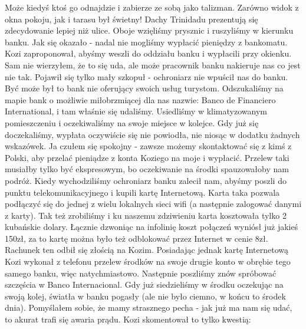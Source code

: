 Może kiedyś ktoś go odnajdzie i zabierze ze sobą jako talizman.
Zarówno widok z okna pokoju, jak i tarasu był świetny!
Dachy Trinidadu prezentują się zdecydowanie lepiej niż ulice.
Oboje wzięliśmy prysznic i ruszyliśmy w kierunku banku.
Jak się okazało - nadal nie mogliśmy wypłacić pieniędzy z bankomatu.
Kozi zaproponował, abyśmy weszli do oddziału banku i wypłacili przy okienku.
Sam nie wierzyłem, że to się uda, ale może pracownik banku nakieruje nas co jest nie tak.
Pojawił się tylko mały szkopuł - ochroniarz nie wpuścił nas do banku.
Być może był to bank nie oferujący swoich usług turystom.
Odszukaliśmy na mapie bank o możliwie miłobrzmiącej dla nas nazwie: Banco de Financiero International, i tam właśnie się udaliśmy.
Usiedliśmy w klimatyzowanym pomieszczeniu i oczekiwaliśmy na swoje miejsce w kolejce.
Gdy już się doczekaliśmy, wypłata oczywiście się nie powiodła, nie niosąc w dodatku żadnych wskazówek.
Ja czułem się spokojny - zawsze możemy skontaktować się z kimś z Polski, aby przelać pieniądze z konta Koziego na moje i wypłacić.
Przelew taki musiałby tylko być ekspresowym, bo oczekiwanie na środki spauzowałoby nam podróż.
Kiedy wychodziliśmy ochroniarz banku zalecił nam, abyśmy poszli do punktu telekomunikacyjnego i kupili kartę Internetową.
Karta taka pozwala podłączyć się do jednej z wielu lokalnych sieci wifi (a następnie zalogować danymi z karty).
Tak też zrobiliśmy i ku naszemu zdziwieniu karta kosztowała tylko 2 kubańskie dolary.
Łącznie dzwoniąc na infolinię koszt połączeń wyniósł już jakieś 150zł, za to kartę można było też odblokować przez Internet w cenie 8zł.
Rachunek ten odbił się złością na Kozim.
Posiadając jednak kartę Internetową Kozi wykonał z telefonu przelew środków na swoje drugie konto w obrębie tego samego banku, więc natychmiastowo.
Następnie poszliśmy znów spróbować szczęścia w Banco Internacional.
Gdy już siedzieliśmy w środku oczekując na swoją kolej, światła w banku pogasły (ale nie było ciemno, w końcu to środek dnia).
Pomyślałem sobie, że mamy strasznego pecha - jak już ma nam się udać, to akurat trafi się awaria prądu.
Kozi skomentował to tylko kwestią:


